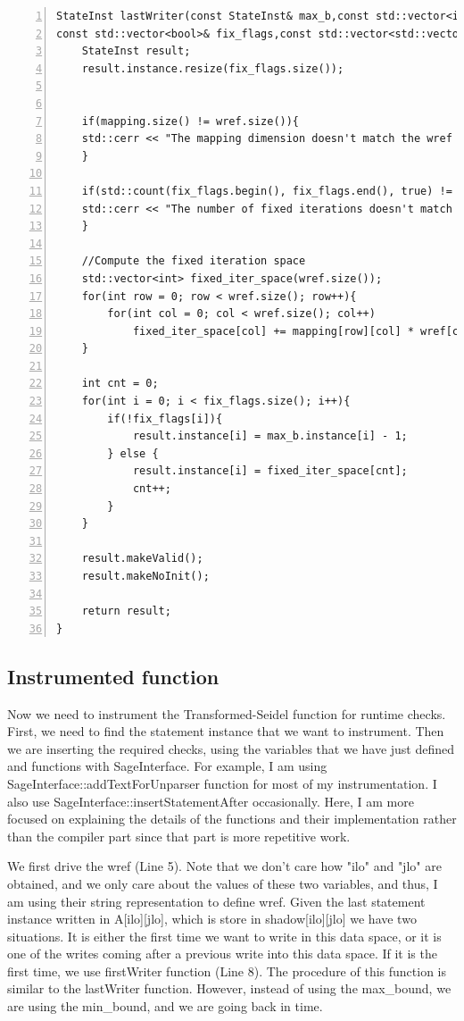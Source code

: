 \documentclass[letterpaper,12pt]{article}
\begin{document}
   \begin{lstlisting}[caption={The lastWriter fucntion}, label={code:lastWriter}, captionpos=b, numbers=left,
   stepnumber=1]
StateInst lastWriter(const StateInst& max_b,const std::vector<int>& wref,
const std::vector<bool>& fix_flags,const std::vector<std::vector<int>>& mapping){
	StateInst result;
	result.instance.resize(fix_flags.size());


	if(mapping.size() != wref.size()){
	std::cerr << "The mapping dimension doesn't match the wref dimentions" << std::endl;
	}
	
	if(std::count(fix_flags.begin(), fix_flags.end(), true) != wref.size()){
	std::cerr << "The number of fixed iterations doesn't match the flag indicator" << std::endl;
	}
	
	//Compute the fixed iteration space
	std::vector<int> fixed_iter_space(wref.size());
	for(int row = 0; row < wref.size(); row++){
		for(int col = 0; col < wref.size(); col++)
			fixed_iter_space[col] += mapping[row][col] * wref[col];
	}
	
	int cnt = 0;
	for(int i = 0; i < fix_flags.size(); i++){
		if(!fix_flags[i]){
			result.instance[i] = max_b.instance[i] - 1;
		} else {
			result.instance[i] = fixed_iter_space[cnt];
			cnt++;
		}
	}

	result.makeValid();
	result.makeNoInit();
	
	return result;
}
	\end{lstlisting}
	
	\subsection{Instrumented function}	
	Now we need to instrument the Transformed-Seidel function for runtime checks. First, we need to find the statement instance that we want to instrument. Then we are inserting the required checks, using the variables that we have just defined and functions with SageInterface. For example, I am using SageInterface::addTextForUnparser function for most of my instrumentation. I also use  SageInterface::insertStatementAfter occasionally. Here, I am more focused on explaining the details of the functions and their implementation rather than the compiler part since that part is more repetitive work.

	We first drive the wref (Line 5). Note that we don't care how "ilo" and "jlo"  are obtained, and we only care about the values of these two variables, and thus, I am using their string representation to define wref. Given the last statement instance written in A[ilo][jlo], which is store in shadow[ilo][jlo] we have two situations. It is either the first time we want to write in this data space, or it is one of the writes coming after a previous write into this data space. If it is the first time, we use firstWriter function (Line 8). The procedure of this function is similar to the lastWriter function. However, instead of using the max\_bound, we are using the min\_bound, and we are going back in time.
	
\end{document}
